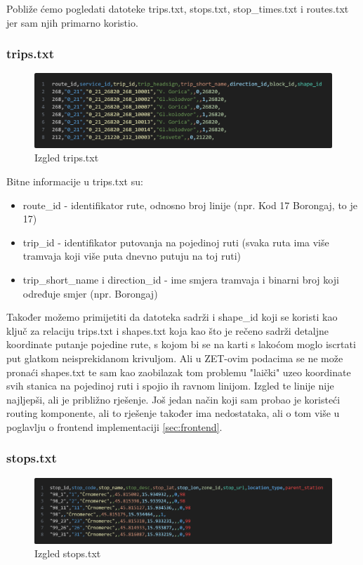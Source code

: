 \documentclass[zavrsnirad]{fer}
\begin{document}
Pobliže ćemo pogledati datoteke trips.txt, stops.txt, stop\_times.txt i routes.txt jer sam njih primarno koristio.

\subsubsection{trips.txt}

\begin{figure}[htb]
	\centering
	\includegraphics[width=0.7\linewidth]{Figures/trips.png} 
	\caption{Izgled trips.txt}
	\label{slk:trips}
\end{figure}

Bitne informacije u trips.txt su:
\begin{itemize}
	\item route\_id - identifikator rute, odnosno broj linije (npr. Kod 17 Borongaj, to je 17)
	\item trip\_id - identifikator putovanja na pojedinoj ruti (svaka ruta ima više tramvaja koji više puta dnevno putuju na toj ruti)
	\item trip\_short\_name i direction\_id - ime smjera tramvaja i binarni broj koji određuje smjer (npr. Borongaj)
\end{itemize}

Također možemo primijetiti da datoteka sadrži i shape\_id koji se koristi kao ključ za relaciju trips.txt i shapes.txt koja kao što je rečeno sadrži detaljne koordinate putanje pojedine rute, s kojom bi se na karti s lakoćom moglo iscrtati put glatkom neisprekidanom krivuljom.
Ali u ZET-ovim podacima se ne može pronaći shapes.txt te sam kao zaobilazak tom problemu "laički" uzeo koordinate svih stanica na pojedinoj ruti i spojio ih ravnom linijom. Izgled te linije nije najljepši, ali je približno rješenje. Još jedan način koji sam probao je koristeći routing komponente, ali to rješenje također ima nedostataka, ali o tom više u poglavlju o frontend implementaciji \ref{sec:frontend}.

\subsubsection{stops.txt}

\begin{figure}[htb]
	\centering
	\includegraphics[width=0.7\linewidth]{Figures/stops.png} 
	\caption{Izgled stops.txt}
	\label{slk:stops}
\end{figure}
\end{document}
